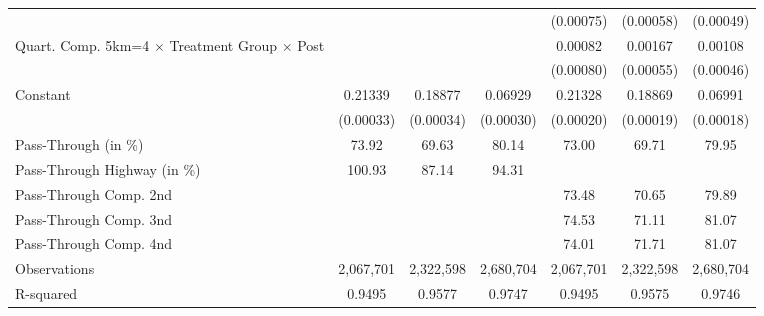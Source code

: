 {\begin{tabular}{l*{6}{c}}
                    &                     &                     &                     &   (0.00075)         &   (0.00058)         &   (0.00049)         \\
Quart. Comp. 5km=4 $\times$ Treatment Group $\times$ Post&                     &                     &                     &     0.00082         &     0.00167\sym{***}&     0.00108\sym{**} \\
                    &                     &                     &                     &   (0.00080)         &   (0.00055)         &   (0.00046)         \\
Constant            &     0.21339\sym{***}&     0.18877\sym{***}&     0.06929\sym{***}&     0.21328\sym{***}&     0.18869\sym{***}&     0.06991\sym{***}\\
                    &   (0.00033)         &   (0.00034)         &   (0.00030)         &   (0.00020)         &   (0.00019)         &   (0.00018)         \\
\midrule
Pass-Through (in \%)&       73.92         &       69.63         &       80.14         &       73.00         &       69.71         &       79.95         \\
Pass-Through Highway (in \%)&      100.93         &       87.14         &       94.31         &                     &                     &                     \\
Pass-Through Comp. 2nd&                     &                     &                     &       73.48         &       70.65         &       79.89         \\
Pass-Through Comp. 3nd&                     &                     &                     &       74.53         &       71.11         &       81.07         \\
Pass-Through Comp. 4nd&                     &                     &                     &       74.01         &       71.71         &       81.07         \\
Observations        &   2,067,701         &   2,322,598         &   2,680,704         &   2,067,701         &   2,322,598         &   2,680,704         \\
R-squared           &      0.9495         &      0.9577         &      0.9747         &      0.9495         &      0.9575         &      0.9746         \\
\bottomrule
\end{tabular}
}
